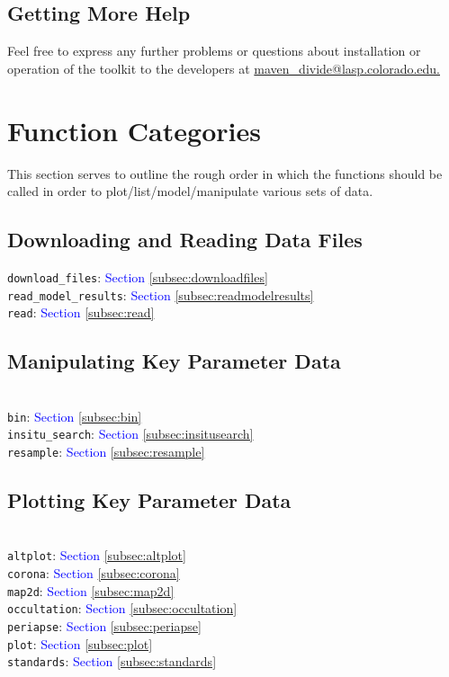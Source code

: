 \documentclass{article}
\begin{document}
\subsection{Getting More Help}
Feel free to express any further problems or questions about installation or operation of the toolkit to the developers at \href{maven_divide@lasp.colorado.edu}{maven\_divide@lasp.colorado.edu.}

\section{Function Categories}
This section serves to outline the rough order in which the functions should be called in order to plot/list/model/manipulate various sets of data.

\subsection{Downloading and Reading Data Files}
\indent \texttt{download\_files}: \textcolor{blue}{Section \ref{subsec:downloadfiles}}\\
\indent \texttt{read\_model\_results}: \textcolor{blue}{Section \ref{subsec:readmodelresults}}\\
\indent \texttt{read}: \textcolor{blue}{Section \ref{subsec:read}}\\
\vspace{-10mm}
\subsection{Manipulating Key Parameter Data}
\vspace{-10mm}
\noindent\\
\indent \texttt{bin}: \textcolor{blue}{Section \ref{subsec:bin}}\\
\indent \texttt{insitu\_search}: \textcolor{blue}{Section \ref{subsec:insitusearch}}\\
\indent \texttt{resample}: \textcolor{blue}{Section \ref{subsec:resample}}\\
\vspace{-10mm}
\subsection{Plotting Key Parameter Data}
\vspace{-10mm}
\noindent\\
\indent \texttt{altplot}: \textcolor{blue}{Section \ref{subsec:altplot}}\\
\indent \texttt{corona}: \textcolor{blue}{Section \ref{subsec:corona}}\\
\indent \texttt{map2d}: \textcolor{blue}{Section \ref{subsec:map2d}}\\
\indent \texttt{occultation}: \textcolor{blue}{Section \ref{subsec:occultation}}\\
\indent \texttt{periapse}: \textcolor{blue}{Section \ref{subsec:periapse}}\\
\indent \texttt{plot}: \textcolor{blue}{Section \ref{subsec:plot}}\\
\indent \texttt{standards}: \textcolor{blue}{Section \ref{subsec:standards}}\\
\vspace{-10mm}
\end{document}
